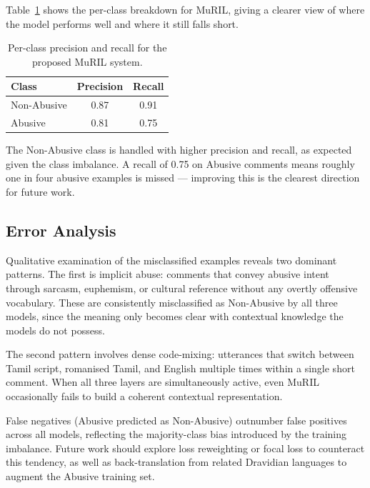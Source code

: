 \documentclass[11pt]{article}
\begin{document}
Table~\ref{tab:perclass} shows the per-class breakdown for MuRIL, giving a clearer
view of where the model performs well and where it still falls short.

\begin{table}[H]
\centering\small
\setlength{\tabcolsep}{6pt}\renewcommand{\arraystretch}{1.1}
\begin{tabular}{lcc}
\toprule
\rowcolor{headerblue}\textbf{Class} & \textbf{Precision} & \textbf{Recall} \\
\midrule
Non-Abusive & 0.87 & 0.91 \\
Abusive     & 0.81 & 0.75 \\
\bottomrule
\end{tabular}
\caption{Per-class precision and recall for the proposed MuRIL system.}
\label{tab:perclass}
\end{table}

The Non-Abusive class is handled with higher precision and recall, as expected given
the class imbalance. A recall of 0.75 on Abusive comments means roughly one in four
abusive examples is missed --- improving this is the clearest direction for future work.

\subsection{Error Analysis}
Qualitative examination of the misclassified examples reveals two dominant patterns.
The first is implicit abuse: comments that convey abusive intent through sarcasm,
euphemism, or cultural reference without any overtly offensive vocabulary. These are
consistently misclassified as Non-Abusive by all three models, since the meaning only
becomes clear with contextual knowledge the models do not possess.

The second pattern involves dense code-mixing: utterances that switch between Tamil
script, romanised Tamil, and English multiple times within a single short comment.
When all three layers are simultaneously active, even MuRIL occasionally fails to
build a coherent contextual representation.

False negatives (Abusive predicted as Non-Abusive) outnumber false positives across
all models, reflecting the majority-class bias introduced by the training imbalance.
Future work should explore loss reweighting or focal loss to counteract this tendency,
as well as back-translation from related Dravidian languages to augment the Abusive
training set.
\end{document}

